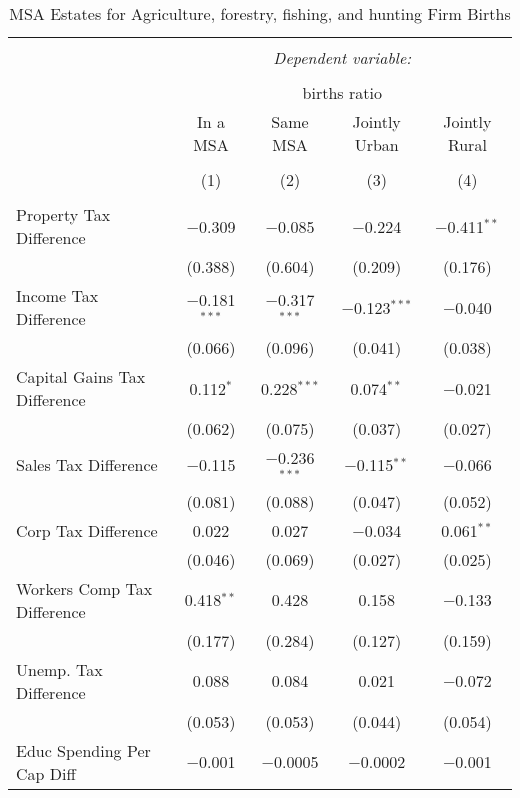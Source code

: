 
\begin{table}[!htbp] \centering 
  \caption{MSA Estates for  Agriculture, forestry, fishing, and hunting Firm Births} 
  \label{} 
\begin{tabular}{@{\extracolsep{5pt}}lcccc} 
\\[-1.8ex]\hline 
\hline \\[-1.8ex] 
 & \multicolumn{4}{c}{\textit{Dependent variable:}} \\ 
\cline{2-5} 
\\[-1.8ex] & \multicolumn{4}{c}{births ratio} \\ 
 & In a MSA & Same MSA & Jointly Urban & Jointly Rural \\ 
\\[-1.8ex] & (1) & (2) & (3) & (4)\\ 
\hline \\[-1.8ex] 
 Property Tax Difference & $-$0.309 & $-$0.085 & $-$0.224 & $-$0.411$^{**}$ \\ 
  & (0.388) & (0.604) & (0.209) & (0.176) \\ 
  Income Tax Difference & $-$0.181$^{***}$ & $-$0.317$^{***}$ & $-$0.123$^{***}$ & $-$0.040 \\ 
  & (0.066) & (0.096) & (0.041) & (0.038) \\ 
  Capital Gains Tax Difference & 0.112$^{*}$ & 0.228$^{***}$ & 0.074$^{**}$ & $-$0.021 \\ 
  & (0.062) & (0.075) & (0.037) & (0.027) \\ 
  Sales Tax Difference & $-$0.115 & $-$0.236$^{***}$ & $-$0.115$^{**}$ & $-$0.066 \\ 
  & (0.081) & (0.088) & (0.047) & (0.052) \\ 
  Corp Tax Difference & 0.022 & 0.027 & $-$0.034 & 0.061$^{**}$ \\ 
  & (0.046) & (0.069) & (0.027) & (0.025) \\ 
  Workers Comp Tax Difference & 0.418$^{**}$ & 0.428 & 0.158 & $-$0.133 \\ 
  & (0.177) & (0.284) & (0.127) & (0.159) \\ 
  Unemp. Tax Difference & 0.088 & 0.084 & 0.021 & $-$0.072 \\ 
  & (0.053) & (0.053) & (0.044) & (0.054) \\ 
  Educ Spending Per Cap Diff & $-$0.001 & $-$0.0005 & $-$0.0002 & $-$0.001 \\ 

\end{tabular}
\end{table}
